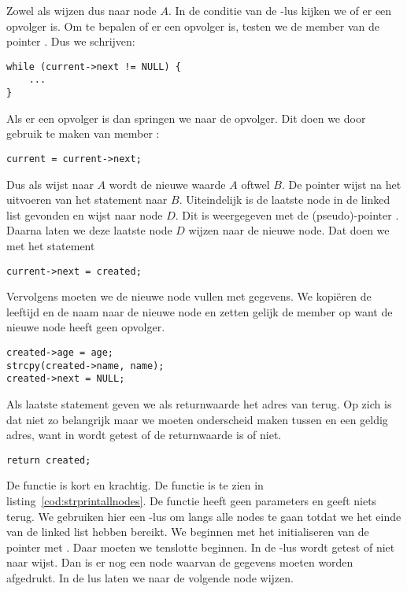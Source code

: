 Zowel  als  wijzen dus naar node $A$. In de conditie van de -lus kijken we of er een opvolger is. Om te bepalen of er een opvolger is, testen we de member  van de pointer . Dus we schrijven:

\begin{lstlisting}[style=lstoneline]
while (current->next != NULL) {
    ...
}
\end{lstlisting}

Als er een opvolger is dan springen we naar de opvolger. Dit doen we door gebruik te maken van member :

\begin{lstlisting}[style=lstoneline]
current = current->next;
\end{lstlisting}

Dus als  wijst naar $A$ wordt de nieuwe waarde $A$ oftwel $B$.
De pointer  wijst na het uitvoeren van het statement naar $B$. Uiteindelijk is de laatste node in de linked list gevonden en wijst  naar node $D$. Dit is weergegeven met de (pseudo)-pointer . Daarna laten we deze laatste node $D$ wijzen naar de nieuwe node. Dat doen we met het statement

\begin{lstlisting}[style=lstoneline]
current->next = created;
\end{lstlisting}

Vervolgens moeten we de nieuwe node vullen met gegevens. We kopiëren de leeftijd en de naam naar de nieuwe node en zetten gelijk de member  op  want de nieuwe node heeft geen opvolger.

\begin{lstlisting}[style=lstoneline]
created->age = age;
strcpy(created->name, name);
created->next = NULL;
\end{lstlisting}

Als laatste statement geven we als returnwaarde het adres van  terug. Op zich is dat niet zo belangrijk maar we moeten onderscheid maken tussen  en een geldig adres, want in  wordt getest of de returnwaarde  is of niet.

\begin{lstlisting}[style=lstoneline]
return created;
\end{lstlisting}

De functie  is kort en krachtig. De functie is te zien in listing~\ref{cod:strprintallnodes}. De functie heeft geen parameters en geeft niets terug.  We gebruiken hier een -lus om langs alle nodes te gaan totdat we het einde van de linked list hebben bereikt. We beginnen met het initialiseren van de pointer  met . Daar moeten we tenslotte beginnen. In de -lus wordt getest of  niet naar  wijst. Dan is er nog een node waarvan de gegevens moeten worden afgedrukt. In de lus laten we  naar de volgende node wijzen. 

